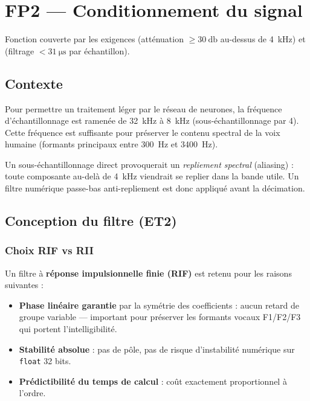 \section{FP2 --- Conditionnement du signal}
\label{sec:fp2}

Fonction couverte par les exigences  (atténuation $\geq \SI{30}{\decibel}$ au-dessus de \SI{4}{\kilo\hertz}) et  (filtrage $< \SI{31}{\micro\second}$ par échantillon).

\subsection{Contexte}

Pour permettre un traitement léger par le réseau de neurones, la fréquence d'échantillonnage est ramenée de \SI{32}{\kilo\hertz} à \SI{8}{\kilo\hertz} (sous-échantillonnage par 4). Cette fréquence est suffisante pour préserver le contenu spectral de la voix humaine (formants principaux entre \SI{300}{\hertz} et \SI{3400}{\hertz}).

Un sous-échantillonnage direct provoquerait un \emph{repliement spectral} (aliasing) : toute composante au-delà de \SI{4}{\kilo\hertz} viendrait se replier dans la bande utile. Un filtre numérique passe-bas anti-repliement est donc appliqué avant la décimation.

\subsection{Conception du filtre (ET2)}

\subsubsection{Choix RIF vs RII}

Un filtre à \textbf{réponse impulsionnelle finie (RIF)} est retenu pour les raisons suivantes :
\begin{itemize}
    \item \textbf{Phase linéaire garantie} par la symétrie des coefficients : aucun retard de groupe variable --- important pour préserver les formants vocaux F1/F2/F3 qui portent l'intelligibilité.
    \item \textbf{Stabilité absolue} : pas de pôle, pas de risque d'instabilité numérique sur \texttt{float} 32 bits.
    \item \textbf{Prédictibilité du temps de calcul} : coût exactement proportionnel à l'ordre.
\end{itemize}

